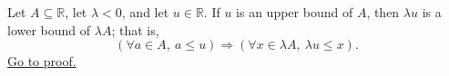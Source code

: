 \begin{proposition}
\label{prop:negative-dilation-sends-upper-to-lower-bounds}
Let $A\subseteq\mathbb{R}$, let $\lambda<0$, and let $u\in\mathbb{R}$.
If $u$ is an upper bound of $A$, then $\lambda u$ is a lower bound of
$\lambda A$; that is,
\[
\left(\forall a\in A,\ a\leq u\right)
\Longrightarrow
\left(\forall x\in\lambda A,\ \lambda u\leq x\right).
\]
\hyperref[prf:negative-dilation-sends-upper-to-lower-bounds]{Go to proof.}
\end{proposition}